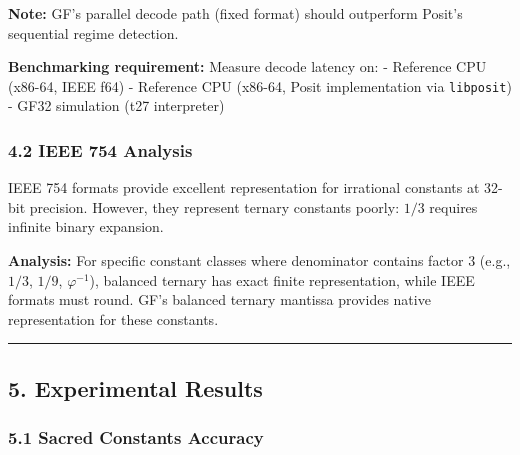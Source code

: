 \textbf{Note:} GF's parallel decode path (fixed format) should
outperform Posit's sequential regime detection.

\textbf{Benchmarking requirement:} Measure decode latency on: -
Reference CPU (x86-64, IEEE f64) - Reference CPU (x86-64, Posit
implementation via \texttt{libposit}) - GF32 simulation (t27
interpreter)

\subsubsection{4.2 IEEE 754 Analysis}\label{ieee-754-analysis}

IEEE 754 formats provide excellent representation for irrational
constants at 32-bit precision. However, they represent ternary constants
poorly: \(1/3\) requires infinite binary expansion.

\textbf{Analysis:} For specific constant classes where denominator
contains factor 3 (e.g., \(1/3\), \(1/9\), \(\varphi^{-1}\)), balanced
ternary has exact finite representation, while IEEE formats must round.
GF's balanced ternary mantissa provides native representation for these
constants.

\begin{center}\rule{0.5\linewidth}{0.5pt}\end{center}

\subsection{5. Experimental Results}\label{experimental-results}

\subsubsection{5.1 Sacred Constants
Accuracy}\label{sacred-constants-accuracy}

